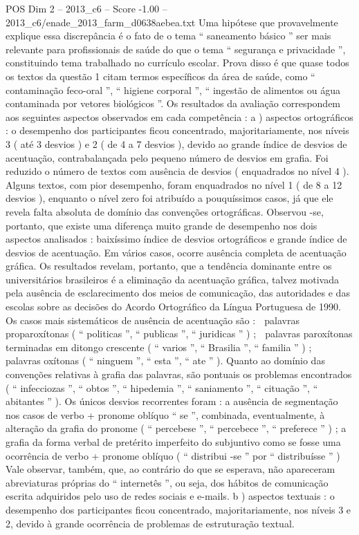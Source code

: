 \begin{textsample}{POS Dim 2 – 2013\_c6 – Score -1.00 – 2013\_c6/enade\_2013\_farm\_d0638aebea.txt}
Uma hipótese que provavelmente explique essa discrepância é o fato de o tema “ saneamento básico ” ser mais relevante para profissionais de saúde do que o tema “ segurança e privacidade ”, constituindo tema trabalhado no currículo escolar.
Prova disso é que quase todos os textos da questão 1 citam termos específicos da área de saúde, como “ contaminação feco-oral ”, “ higiene corporal ”, “ ingestão de alimentos ou água contaminada por vetores biológicos ”.
Os resultados da avaliação correspondem aos seguintes aspectos observados em cada competência : a ) aspectos ortográficos : o desempenho dos participantes ficou concentrado, majoritariamente, nos níveis 3 ( até 3 desvios ) e 2 ( de 4 a 7 desvios ), devido ao grande índice de desvios de acentuação, contrabalançada pelo pequeno número de desvios em grafia.
Foi reduzido o número de textos com ausência de desvios ( enquadrados no nível 4 ).
Alguns textos, com pior desempenho, foram enquadrados no nível 1 ( de 8 a 12 desvios ), enquanto o nível zero foi atribuído a pouquíssimos casos, já que ele revela falta absoluta de domínio das convenções ortográficas.
Observou -se, portanto, que existe uma diferença muito grande de desempenho nos dois aspectos analisados : baixíssimo índice de desvios ortográficos e grande índice de desvios de acentuação.
Em vários casos, ocorre ausência completa de acentuação gráfica.
Os resultados revelam, portanto, que a tendência dominante entre os universitários brasileiros é a eliminação da acentuação gráfica, talvez motivada pela ausência de esclarecimento dos meios de comunicação, das autoridades e das escolas sobre as decisões do Acordo Ortográfico da Língua Portuguesa de 1990.
Os casos mais sistemáticos de ausência de acentuação são :  palavras proparoxítonas ( “ politicas ”, “ publicas ”, “ juridicas ” ) ;  palavras paroxítonas terminadas em ditongo crescente ( “ varios ”, “ Brasilia ”, “ familia ” ) ;  palavras oxítonas ( “ ninguem ”, “ esta ”, “ ate ” ).
Quanto ao domínio das convenções relativas à grafia das palavras, são pontuais os problemas encontrados ( “ infecciozas ”, “ obtos ”, “ hipedemia ”, “ saniamento ”, “ cituação ”, “ abitantes ” ).
Os únicos desvios recorrentes foram : a ausência de segmentação nos casos de verbo + pronome oblíquo “ se ”, combinada, eventualmente, à alteração da grafia do pronome ( “ percebese ”, “ percebece ”, “ preferece ” ) ; a grafia da forma verbal de pretérito imperfeito do subjuntivo como se fosse uma ocorrência de verbo + pronome oblíquo ( “ distribui -se ” por “ distribuísse ” ) Vale observar, também, que, ao contrário do que se esperava, não apareceram abreviaturas próprias do “ internetês ”, ou seja, dos hábitos de comunicação escrita adquiridos pelo uso de redes sociais e e-mails. b ) aspectos textuais : o desempenho dos participantes ficou concentrado, majoritariamente, nos níveis 3 e 2, devido à grande ocorrência de problemas de estruturação textual.

\end{textsample}
